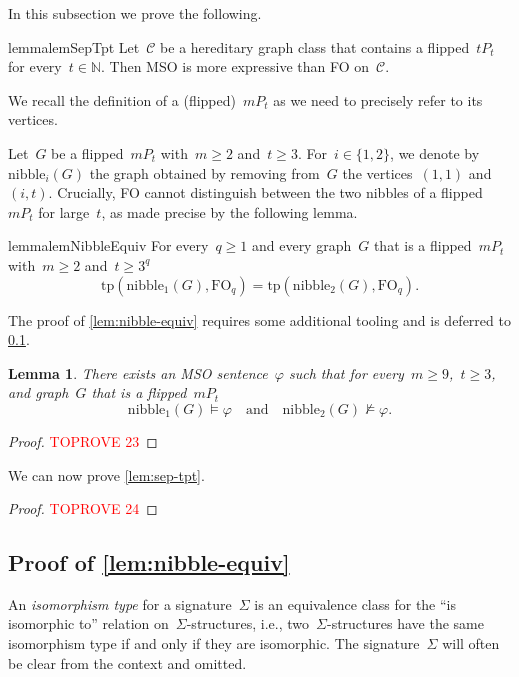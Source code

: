 \documentclass[11pt]{article}      \usepackage[margin=1in]{geometry}  \usepackage{microtype}
\newtheorem{lemma}[theorem]{Lemma}
\theoremstyle{definition}
\newcommand{\N}[0]{\mathrm{\mathbb{N}}}
\newcommand{\tp}{\mathrm{tp}}
\renewcommand{\phi}{\varphi}
\newcommand{\FO}{\mathrm{FO}}
\newcommand{\CC}{\mathcal{C}}
\renewcommand{\ge}{\geqslant}
\renewcommand{\geq}{\ge}
\begin{document}
In this subsection we prove the following.

\begin{restatable}{lemma}{lemSepTpt}
    \label{lem:sep-tpt}
    Let~$\CC$ be a hereditary graph class that contains a flipped~$tP_t$ for every~$t\in\N$.
    Then MSO is more expressive than FO on~$\CC$.
\end{restatable}


We recall the definition of a (flipped)~$mP_t$ as we need to precisely refer to its vertices.

\newcommand{\nibble}{\mathrm{nibble}}
Let~$G$ be a flipped~$mP_t$ with~$m\geq 2$ and~$t \geq 3$.
For~$i \in \{1,2\}$, we denote by~$\nibble_i(G)$ the graph obtained by removing from~$G$ the vertices~$(1,1)$ and~$(i,t)$.
Crucially, FO cannot distinguish between the two nibbles of a flipped~$mP_t$ for large~$t$, as made precise by the following lemma.

\begin{restatable}{lemma}{lemNibbleEquiv}
    \label{lem:nibble-equiv}
    For every~$q\geq 1$ and every graph~$G$ that is a flipped~$mP_t$ with~$m\geq 2$ and~$t \geq 3^q$
    \[
        \tp(\nibble_1(G),\FO_q) = \tp(\nibble_2(G),\FO_q).
    \]
\end{restatable}

The proof of \cref{lem:nibble-equiv} requires some additional tooling and is deferred to \cref{sec:nibble-equiv}.

\begin{lemma}\label{lem:sep-tpt-sentence}
    There exists an MSO sentence~$\phi$ such that for every~$m \geq 9$,~$t \geq 3$, and graph~$G$ that is a flipped~$mP_t$
    \[
        \nibble_1(G) \models \phi \quad\text{and}\quad \nibble_2(G) \not \models \phi.
    \]
\end{lemma}
\begin{proof}\textcolor{red}{TOPROVE 23}\end{proof}

We can now prove \cref{lem:sep-tpt}.
\lemSepTpt*
\begin{proof}\textcolor{red}{TOPROVE 24}\end{proof}

\subsection{Proof of \texorpdfstring{\cref{lem:nibble-equiv}}{lem:nibble-equiv}}\label{sec:nibble-equiv}
An \emph{isomorphism type} for a signature~$\Sigma$ is an equivalence class for the ``is isomorphic to'' relation on~$\Sigma$-structures, i.e., two~$\Sigma$-structures have the same isomorphism type if and only if they are isomorphic.
The signature~$\Sigma$ will often be clear from the context and omitted.
\end{document}
